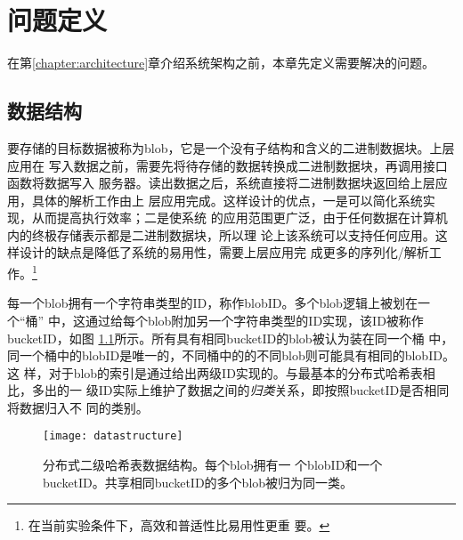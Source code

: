 \chapter{问题定义}\label{chapter:def}
在第\ref{chapter:architecture}章介绍系统架构之前，本章先定义需要解决的问题。

\section{数据结构}
要存储的目标数据被称为blob，它是一个没有子结构和含义的二进制数据块。上层应用在
写入数据之前，需要先将待存储的数据转换成二进制数据块，再调用接口函数将数据写入
服务器。读出数据之后，系统直接将二进制数据块返回给上层应用，具体的解析工作由上
层应用完成。这样设计的优点，一是可以简化系统实现，从而提高执行效率；二是使系统
的应用范围更广泛，由于任何数据在计算机内的终极存储表示都是二进制数据块，所以理
论上该系统可以支持任何应用。这样设计的缺点是降低了系统的易用性，需要上层应用完
成更多的序列化/解析工作。\footnote{在当前实验条件下，高效和普适性比易用性更重
要。}

每一个blob拥有一个字符串类型的ID，称作blobID。多个blob逻辑上被划在一个``桶''
中，这通过给每个blob附加另一个字符串类型的ID实现，该ID被称作bucketID，如图
\ref{figure:datastructure}所示。所有具有相同bucketID的blob被认为装在同一个桶
中，同一个桶中的blobID是唯一的，不同桶中的的不同blob则可能具有相同的blobID。这
样，对于blob的索引是通过给出两级ID实现的。与最基本的分布式哈希表相比，多出的一
级ID实际上维护了数据之间的\emph{归类}关系，即按照bucketID是否相同将数据归入不
同的类别。
\begin{figure}[htb]
  \centering
  \texttt{[image: datastructure]}
  \caption[分布式二级哈希表数据结构]{分布式二级哈希表数据结构。每个blob拥有一
  个blobID和一个bucketID。共享相同bucketID的多个blob被归为同一类。}
  \label{figure:datastructure}
\end{figure}

